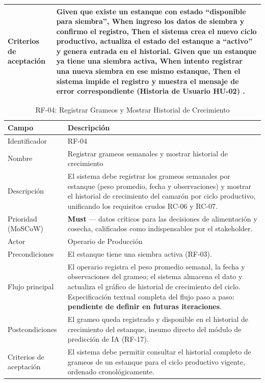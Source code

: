 \documentclass[12pt,a4paper]{article}
\begin{document}
\begin{longtable}{|p{3.6cm}|p{10.4cm}|}
Criterios de aceptación &
\textbf{Given} que existe un estanque con estado ``disponible para siembra'',
\textbf{When} ingreso los datos de siembra y confirmo el registro,
\textbf{Then} el sistema crea el nuevo ciclo productivo, actualiza el estado del
estanque a ``activo'' y genera entrada en el historial.
\textbf{Given} que un estanque ya tiene una siembra activa,
\textbf{When} intento registrar una nueva siembra en ese mismo estanque,
\textbf{Then} el sistema impide el registro y muestra el mensaje de error
correspondiente (Historia de Usuario HU-02) \cite{Cohn2004}. \\ \hline
\end{longtable}

\begin{table}[H]
\centering
\caption{RF-04: Registrar Grameos y Mostrar Historial de Crecimiento}
\begin{tabular}{|p{3.6cm}|p{10.4cm}|}
\hline
\textbf{Campo} & \textbf{Descripción} \\
\hline
Identificador & RF-04 \\ \hline
Nombre & Registrar grameos semanales y mostrar historial de crecimiento \\ \hline
Descripción & El sistema debe registrar los grameos semanales por estanque
(peso promedio, fecha y observaciones) y mostrar el historial de crecimiento
del camarón por ciclo productivo, unificando los requisitos crudos RC-06 y
RC-07. \\ \hline
Prioridad (MoSCoW) & \textbf{Must} --- datos críticos para las decisiones de
alimentación y cosecha, calificados como indispensables por el stakeholder. \\ \hline
Actor & Operario de Producción \\ \hline
Precondiciones & El estanque tiene una siembra activa (RF-03). \\ \hline
Flujo principal & El operario registra el peso promedio semanal, la fecha y
observaciones del grameo; el sistema almacena el dato y actualiza el gráfico de
historial de crecimiento del ciclo. Especificación textual completa del flujo
paso a paso: \textbf{pendiente de definir en futuras iteraciones}. \\ \hline
Postcondiciones & El grameo queda registrado y disponible en el historial de
crecimiento del estanque, insumo directo del módulo de predicción de IA
(RF-17). \\ \hline
Criterios de aceptación & El sistema debe permitir consultar el historial
completo de grameos de un estanque para el ciclo productivo vigente, ordenado
cronológicamente. \\ \hline
\end{tabular}
\end{table}
\end{document}
